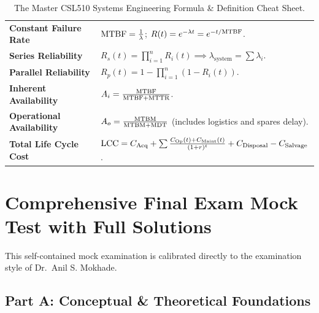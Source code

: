 \begin{table}[htbp]
\begin{tabularx}{\textwidth}{p{4cm}X}
\textbf{Constant Failure Rate} & $\text{MTBF} = \frac{1}{\lambda}$; $R(t) = e^{-\lambda t} = e^{-t / \text{MTBF}}$. \\
\textbf{Series Reliability} & $R_s(t) = \prod_{i=1}^n R_i(t) \implies \lambda_{\text{system}} = \sum \lambda_i$. \\
\textbf{Parallel Reliability} & $R_p(t) = 1 - \prod_{i=1}^n \left(1 - R_i(t)\right)$. \\
\textbf{Inherent Availability} & $A_i = \frac{\text{MTBF}}{\text{MTBF} + \text{MTTR}}$. \\
\textbf{Operational Availability} & $A_o = \frac{\text{MTBM}}{\text{MTBM} + \text{MDT}}$ (includes logistics and spares delay). \\
\textbf{Total Life Cycle Cost} & $\text{LCC} = C_{\text{Acq}} + \sum \frac{C_{\text{Op}}(t) + C_{\text{Maint}}(t)}{(1+r)^t} + C_{\text{Disposal}} - C_{\text{Salvage}}$. \\
\bottomrule
\end{tabularx}
\caption{The Master CSL510 Systems Engineering Formula \& Definition Cheat Sheet.}
\label{tab:master_cheat_sheet}
\end{table}

\section{Comprehensive Final Exam Mock Test with Full Solutions}
\label{sec:mock_exam}

This self-contained mock examination is calibrated directly to the examination style of Dr.~Anil S. Mokhade.

\subsection{Part A: Conceptual \& Theoretical Foundations}

